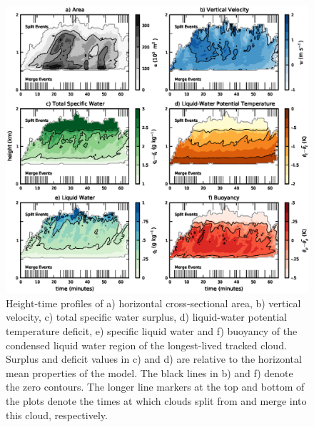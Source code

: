 \documentclass[acp]{copernicus}
\begin{document}
\begin{figure}[t]
\vspace*{2mm}
\begin{center}
\includegraphics[width=\textwidth]{./figures/example_cloud}
\end{center}
\caption{Height-time profiles of a) horizontal cross-sectional area, 
b) vertical velocity, c) total specific water surplus, d) liquid-water 
potential temperature deficit, e) specific liquid water and f) buoyancy of the 
condensed liquid water region of the longest-lived tracked cloud.  Surplus and 
deficit values in c) and d) are relative to the horizontal mean properties of 
the model.  The black lines in b) and f) denote the zero contours.  The longer 
line markers at the top and bottom of the plots denote the times at which 
clouds split from and merge into this cloud, respectively.}
\label{fig:example_cloud}
\end{figure}
\end{document}
